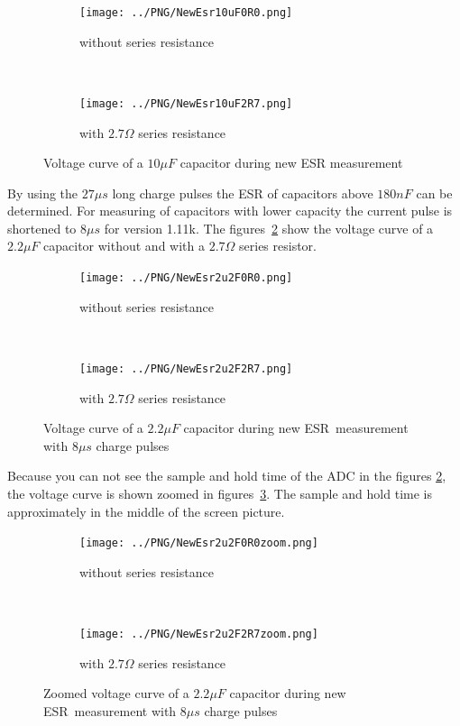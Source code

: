 \begin{figure}[H]
  \begin{subfigure}[b]{9cm}
    \centering
    \texttt{[image: ../PNG/NewEsr10uF0R0.png]}
    \caption{without series resistance}
  \end{subfigure}
  ~
  \begin{subfigure}[b]{9cm}
    \centering
    \texttt{[image: ../PNG/NewEsr10uF2R7.png]}
    \caption{with \(2.7\Omega\) series resistance}
  \end{subfigure}
  \caption{Voltage curve of a \(10\mu F\) capacitor during new ESR measurement}
  \label{pic:NewEsr10}
\end{figure}


By using the \(27\mu s\) long charge pulses the ESR of capacitors above \(180nF\) can be determined.
For measuring of capacitors with lower capacity the current pulse is shortened to \(8\mu s\) for version 1.11k.
The figures~\ref{pic:NewEsr2} show the voltage curve of a \(2.2\mu F\) capacitor without and with
a \(2.7\Omega\) series resistor.

\begin{figure}[H]
  \begin{subfigure}[b]{9cm}
    \centering
    \texttt{[image: ../PNG/NewEsr2u2F0R0.png]}
    \caption{without series resistance}
  \end{subfigure}
  ~
  \begin{subfigure}[b]{9cm}
    \centering
    \texttt{[image: ../PNG/NewEsr2u2F2R7.png]}
    \caption{with \(2.7\Omega\) series resistance}
  \end{subfigure}
  \caption{Voltage curve of a \(2.2\mu F\) capacitor during new ESR~measurement with \(8\mu s\) charge pulses}
  \label{pic:NewEsr2}
\end{figure}

Because you can not see the sample and hold time of the ADC in the figures \ref{pic:NewEsr2},  the voltage curve is shown zoomed
in figures~\ref{pic:NewEsr2zoom}. The sample and hold time is approximately in the middle of the screen picture.

\begin{figure}[H]
  \begin{subfigure}[b]{9cm}
    \centering
    \texttt{[image: ../PNG/NewEsr2u2F0R0zoom.png]}
    \caption{without series resistance}
  \end{subfigure}
  ~
  \begin{subfigure}[b]{9cm}
    \centering
    \texttt{[image: ../PNG/NewEsr2u2F2R7zoom.png]}
    \caption{with \(2.7\Omega\) series resistance}
  \end{subfigure}
  \caption{Zoomed voltage curve of a \(2.2\mu F\) capacitor during new ESR~measurement with \(8\mu s\) charge pulses}
  \label{pic:NewEsr2zoom}
\end{figure}
 

